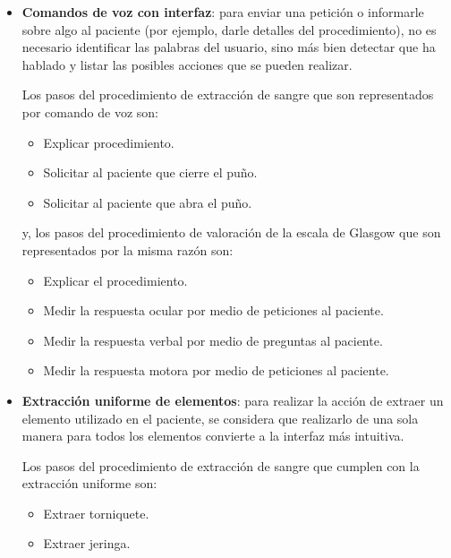 \begin{itemize}
\item 
    \textbf{Comandos de voz con interfaz}:  para enviar una petición o informarle 
    sobre algo al paciente (por ejemplo, darle detalles del procedimiento), 
    no es necesario identificar las palabras del usuario, sino más bien detectar
    que ha hablado y listar las posibles acciones que se pueden realizar.
    
    Los pasos del procedimiento de extracción de sangre que son representados por 
    comando de voz son:
    
    \begin{itemize}
        \item Explicar procedimiento.
        \item Solicitar al paciente que cierre el puño.
        \item Solicitar al paciente que abra el puño.
    \end{itemize}
    
    y, los pasos del procedimiento de valoración de la escala de Glasgow 
    que son representados por la misma razón son:
    \begin{itemize}
        \item Explicar el procedimiento.
        \item Medir la respuesta ocular por medio de peticiones al paciente.
        \item Medir la respuesta verbal por medio de preguntas al paciente.
        \item Medir la respuesta motora por medio de peticiones al paciente.
    \end{itemize}

\item
    \textbf{Extracción uniforme de elementos}: para realizar la acción de extraer 
    un elemento utilizado en el paciente, se considera que realizarlo de una sola 
    manera para todos los elementos convierte a la interfaz más intuitiva.

    
    Los pasos del procedimiento de extracción de sangre que cumplen con la extracción 
    uniforme son:
    
    \begin{itemize}
        \item Extraer torniquete.
        \item Extraer jeringa.
    \end{itemize}
    

\end{itemize}
